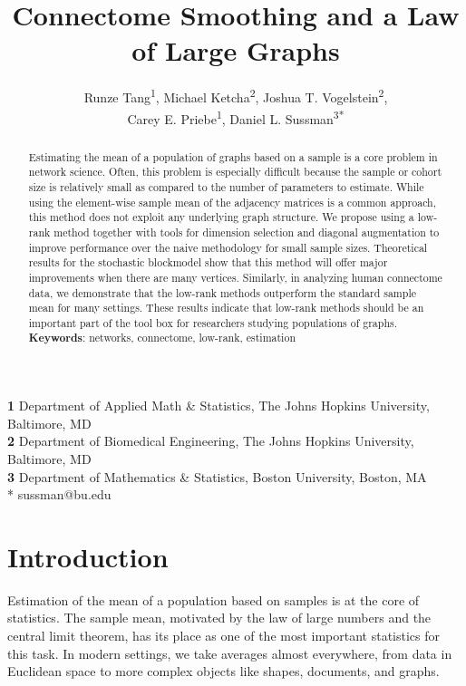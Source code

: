 \documentclass[10pt,letterpaper]{article}
\date{}
\title{Connectome Smoothing and a Law of Large Graphs}
\author{
Runze Tang\textsuperscript{1},
Michael Ketcha\textsuperscript{2},
Joshua T. Vogelstein\textsuperscript{2},\\
Carey E. Priebe\textsuperscript{1},
Daniel L. Sussman\textsuperscript{3*}}
\begin{document}
\maketitle



{\footnotesize
\noindent \textbf{1} Department of Applied Math \& Statistics, The Johns Hopkins University, Baltimore, MD
\\
\textbf{2} Department of Biomedical Engineering,  The Johns Hopkins University, Baltimore, MD
\\
\textbf{3} Department of Mathematics \& Statistics, Boston University, Boston, MA
\\
* sussman@bu.edu
}



\linenumbers
\begin{abstract}
Estimating the mean of a population of graphs based on a sample is a core problem in network science.
Often, this problem is especially difficult because the sample or cohort size is relatively small as compared to the number of parameters to estimate. 
While using the element-wise sample mean of the adjacency matrices is a common approach, this method does not exploit any underlying graph structure.
We propose using a low-rank method together with tools for dimension selection and diagonal augmentation to improve performance over the naive methodology for small sample sizes.
Theoretical results for the stochastic blockmodel show that this method will offer major improvements when there are many vertices.
Similarly, in analyzing human connectome data, we demonstrate that the low-rank methods outperform the standard sample mean for many settings.
These results indicate that low-rank methods should be an important part of the tool box for researchers studying populations of graphs.\\
{\bf Keywords}: networks, connectome, low-rank, estimation
\end{abstract}





\section{Introduction}

Estimation of the mean of a population based on samples is at the core of statistics.
The sample mean, motivated by the law of large numbers and the central limit theorem, has its place as one of the most important statistics for this task.
In modern settings, we take averages almost everywhere, from data in Euclidean space to more complex objects like shapes, documents, and graphs.
\end{document}
